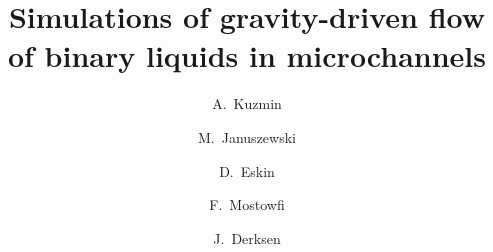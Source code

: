 \documentclass[preprint,12pt]{elsarticle}
\begin{document}
\begin{frontmatter}


\title{Simulations of gravity-driven flow of binary liquids in microchannels}


\author[uofa]{A.~Kuzmin}
\author[us]{M.~Januszewski}
\author[schlum]{D.~Eskin}
\author[schlum]{F.~Mostowfi}
\author[uofa]{J.~Derksen}
\address[uofa]{Chemical and Materials Engineering, University of Alberta\\ 7th Floor, ECERF, 9107
116 St, Edmonton, Alberta, T6G
2V4 Canada}
\address[us]{Insitute of Physics, University of Silesia, 40-007 Katowice, Poland}
\address[schlum]{DBR Schlumberger Technology Center\\ 9450 17 Ave NW, Edmonton, Alberta, T6N 1M9
Canada}


\end{frontmatter}
\end{document}
